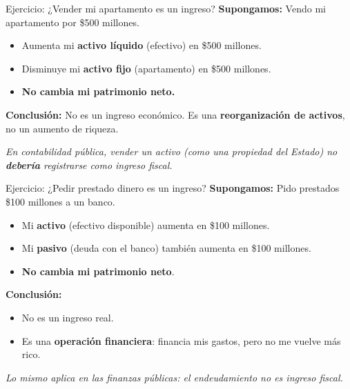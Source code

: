 \begin{frame}{Ejercicio: ¿Vender mi apartamento es un ingreso?}
\textbf{Supongamos:} Vendo mi apartamento por \$500 millones.

\vspace{1em}
\begin{itemize}
  \item Aumenta mi \textbf{activo líquido} (efectivo) en \$500 millones.
  \item Disminuye mi \textbf{activo fijo} (apartamento) en \$500 millones.
  \item \textbf{No cambia mi patrimonio neto.}
\end{itemize}

\vspace{1em}
\textbf{Conclusión:} No es un ingreso económico.  
Es una \textbf{reorganización de activos}, no un aumento de riqueza.

\vspace{1em}
\textit{En contabilidad pública, vender un activo (como una propiedad del Estado) no \textbf{debería} registrarse como ingreso fiscal.}
\end{frame}

\begin{frame}{Ejercicio: ¿Pedir prestado dinero es un ingreso?}
\textbf{Supongamos:} Pido prestados \$100 millones a un banco.

\vspace{1em}
\begin{itemize}
  \item Mi \textbf{activo} (efectivo disponible) aumenta en \$100 millones.
  \item Mi \textbf{pasivo} (deuda con el banco) también aumenta en \$100 millones.
  \item \textbf{No cambia mi patrimonio neto}.
\end{itemize}

\vspace{1em}
\textbf{Conclusión:}
\begin{itemize}
  \item No es un ingreso real.
  \item Es una \textbf{operación financiera}: financia mis gastos, pero no me vuelve más rico.
\end{itemize}

\vspace{1em}
\textit{Lo mismo aplica en las finanzas públicas: el endeudamiento no es ingreso fiscal.}
\end{frame}

